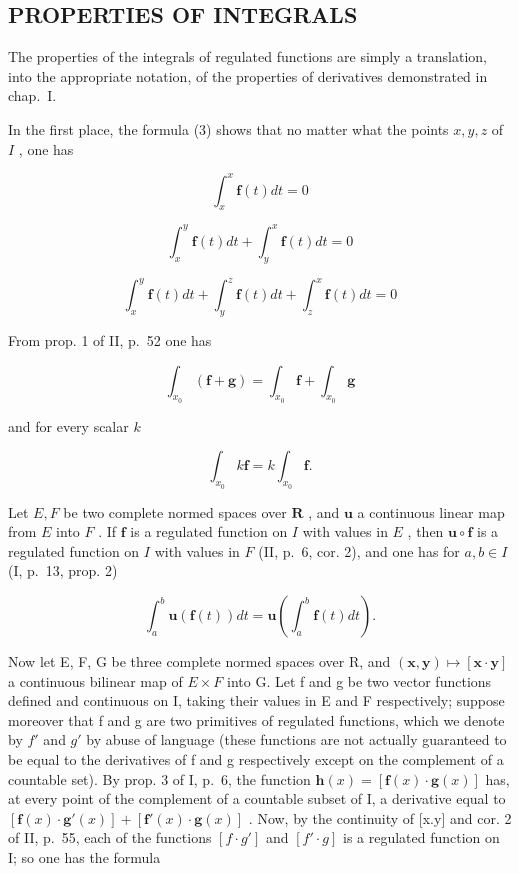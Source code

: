 \subsection{PROPERTIES OF INTEGRALS}

The properties of the integrals of regulated functions are simply a translation, into the appropriate notation, of the properties of derivatives demonstrated in chap.~I.

In the first place, the formula (3) shows that no matter what the points \(x, y, z\) of \(I\) , one has

\[
\int_ {x} ^ {x} \mathbf {f} (t) d t = 0\tag{4}
\]

\[
\int_ {x} ^ {y} \mathbf {f} (t) d t + \int_ {y} ^ {x} \mathbf {f} (t) d t = 0\tag{5}
\]

\[
\int_ {x} ^ {y} \mathbf {f} (t) d t + \int_ {y} ^ {z} \mathbf {f} (t) d t + \int_ {z} ^ {x} \mathbf {f} (t) d t = 0\tag{6}
\]

From prop. 1 of II, p.~52 one has

\[
\int_ {x _ {0}} (\mathbf {f} + \mathbf {g}) = \int_ {x _ {0}} \mathbf {f} + \int_ {x _ {0}} \mathbf {g}\tag{7}
\]

and for every scalar \(k\)

\[
\int_ {x _ {0}} k \mathbf {f} = k \int_ {x _ {0}} \mathbf {f}.\tag{8}
\]

Let \(E, F\) be two complete normed spaces over \(\mathbf{R}\) , and \(\mathbf{u}\) a continuous linear map from \(E\) into \(F\) . If \(\mathbf{f}\) is a regulated function on \(I\) with values in \(E\) , then \(\mathbf{u} \circ \mathbf{f}\) is a regulated function on \(I\) with values in \(F\) (II, p.~6, cor. 2), and one has for \(a, b \in I\) (I, p.~13, prop. 2)

\[
\int_ {a} ^ {b} \mathbf {u} (\mathbf {f} (t)) d t = \mathbf {u} \left(\int_ {a} ^ {b} \mathbf {f} (t) d t\right).\tag{9}
\]

Now let E, F, G be three complete normed spaces over R, and \((\mathbf{x}, \mathbf{y}) \mapsto [\mathbf{x} \cdot \mathbf{y}]\) a continuous bilinear map of \(E \times F\) into G. Let f and g be two vector functions defined and continuous on I, taking their values in E and F respectively; suppose moreover that f and g are two primitives of regulated functions, which we denote by \(f'\) and \(g'\) by abuse of language (these functions are not actually guaranteed to be equal to the derivatives of f and g respectively except on the complement of a countable set). By prop. 3 of I, p.~6, the function \(\mathbf{h}(x) = [\mathbf{f}(x) \cdot \mathbf{g}(x)]\) has, at every point of the complement of a countable subset of I, a derivative equal to \([\mathbf{f}(x) \cdot \mathbf{g}'(x)] + [\mathbf{f}'(x) \cdot \mathbf{g}(x)]\) . Now, by the continuity of {[}x.y{]} and cor. 2 of II, p.~55, each of the functions \([f \cdot g']\) and \([f' \cdot g]\) is a regulated function on I; so one has the formula

